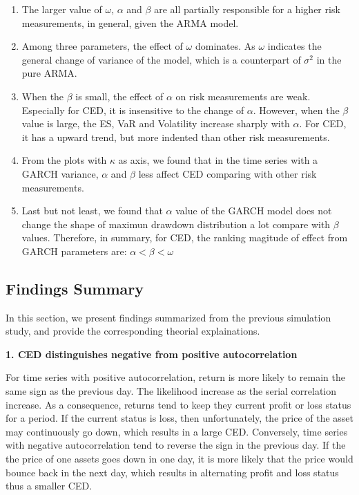 \documentclass[11pt]{article}
\begin{document}
\begin{enumerate}
\item The larger value of $\omega$, $\alpha$ and $\beta$ are all partially responsible for a higher risk measurements, in general, given the ARMA model.
\item Among three parameters, the effect of $\omega$ dominates. As $\omega$ indicates the general change of variance of the model, which is a counterpart of $\sigma^2$ in the pure ARMA.
\item When the $\beta$ is small, the effect of $\alpha$ on risk measurements are weak. Especially for CED, it is insensitive to the change of $\alpha$. However, when the $\beta$ value is large, the ES, VaR and Volatility increase sharply with $\alpha$. For CED, it has a upward trend, but more indented than other risk measurements.
\item From the plots with $\kappa$ as axis, we found that in the time series with a GARCH variance, $\alpha$ and $\beta$ less affect CED comparing with other risk measurements.
\item Last but not least, we found that $\alpha$ value of the GARCH model does not change the shape of maximun drawdown distribution a lot compare with $\beta$ values. Therefore, in summary, for CED, the ranking magitude of effect from GARCH parameters are: $\alpha < \beta < \omega$
\end{enumerate}

\subsection{Findings Summary}

In this section, we present findings summarized from the previous simulation study, and provide the corresponding theorial explainations. 

\textbf{1. CED distinguishes negative from positive autocorrelation}

For time series with positive autocorrelation, return is more likely to remain the same sign as the previous day. The likelihood increase as the serial correlation increase. As a consequence, returns tend to keep they current profit or loss status for a period. If the current status is loss, then unfortunately, the price of the asset may continuously go down, which results in a large CED. Conversely, time series with negative autocorrelation tend to reverse the sign in the previous day. If the the price of one assets goes down in one day, it is more likely that the price would bounce back in the next day, which results in alternating profit and loss status thus a smaller CED.
\end{document}
